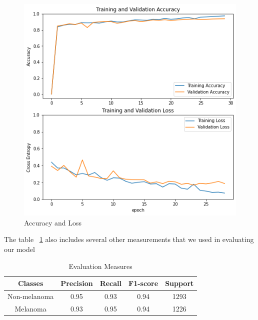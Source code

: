     \begin{figure}[htbp]
    \begin{center}
    \includegraphics[width=15cm]{./chapter-05-our-contribution/1.png}
    \end{center}
    \caption{Accuracy and Loss}
    \label{fig:acc-loss}
    \end{figure}

    The table ~\ref{tab:eval} also includes several other measurements that we used in evaluating our model


    \begin{table}[htbp]
    \begin{center}
        \begin{tabular}{|c|c|c|c|c|}
        \hline 
        Classes & Precision & Recall & F1-score & Support \\ 
        \hline 
        Non-melanoma & 0.95 & 0.93 & 0.94 & 1293 \\ 
        \hline 
        Melanoma & 0.93 & 0.95 & 0.94 & 1226 \\ 
        \hline 
        \end{tabular} 
    \end{center}
    \caption{Evaluation Measures}
    \label{tab:eval}
    \end{table}






